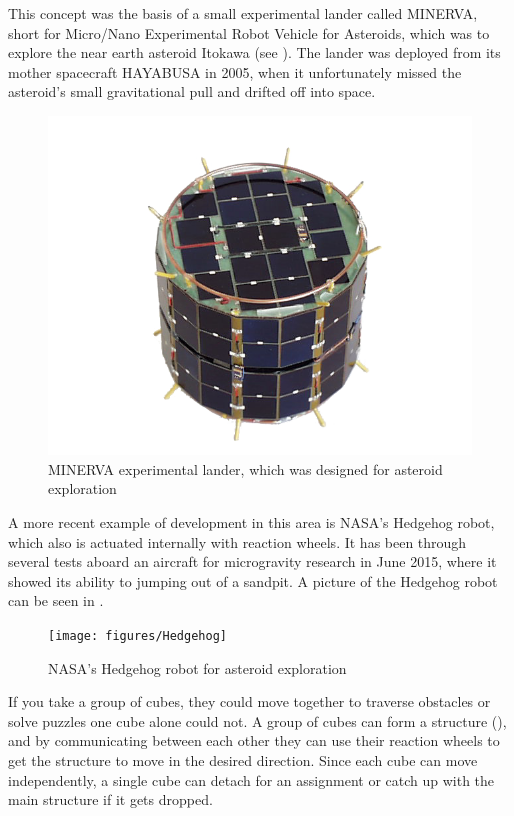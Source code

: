 This concept was the basis of a small experimental lander called MINERVA, short for Micro/Nano Experimental Robot Vehicle for Asteroids, which was to explore the near earth asteroid Itokawa (see ). The lander was deployed from its mother spacecraft HAYABUSA in 2005, when it unfortunately missed the asteroid's small gravitational pull and drifted off into space. \cite{TYoshimitsu}
%
\begin{figure}[H] 
	\centering
	\includegraphics[scale=.8]{figures/MINERVA2}
	\caption{MINERVA experimental lander, which was designed for asteroid exploration \cite{TYoshimitsu}}
	\label{MINERVA}
\end{figure}
%
A more recent example of development in this area is NASA's Hedgehog robot, which also is actuated internally with reaction wheels. It has been through several tests aboard an aircraft for microgravity research in June 2015, where it showed its ability to jumping out of a sandpit. A picture of the Hedgehog robot can be seen in . \cite{ELandau}
%
\begin{figure}[H] 
	\centering
	\texttt{[image: figures/Hedgehog]}
	\caption{NASA's Hedgehog robot for asteroid exploration \cite{ELandau}}
	\label{Hedgehog}
\end{figure}
%
%
If you take a group of cubes, they could move together to traverse obstacles or solve puzzles one cube alone could not. A group of cubes can form a structure (), and by communicating between each other they can use their reaction wheels to get the structure to move in the desired direction. Since each cube can move independently, a single cube can detach for an assignment or catch up with the main structure if it gets dropped.\cite{JRomanishin}
